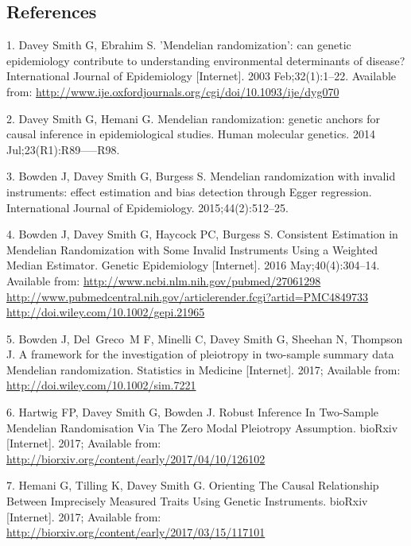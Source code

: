\documentclass[]{article}
\begin{document}
\newpage

\subsection*{References}\label{references}

\hypertarget{refs}{}
\hypertarget{ref-DaveySmith2003}{}
1. Davey Smith G, Ebrahim S. 'Mendelian randomization': can genetic
epidemiology contribute to understanding environmental determinants of
disease? International Journal of Epidemiology {[}Internet{]}. 2003
Feb;32(1):1--22. Available from:
\url{http://www.ije.oxfordjournals.org/cgi/doi/10.1093/ije/dyg070}

\hypertarget{ref-DaveySmithHemani2014}{}
2. Davey Smith G, Hemani G. Mendelian randomization: genetic anchors for
causal inference in epidemiological studies. Human molecular genetics.
2014 Jul;23(R1):R89-----R98.

\hypertarget{ref-Bowden2015}{}
3. Bowden J, Davey Smith G, Burgess S. Mendelian randomization with
invalid instruments: effect estimation and bias detection through Egger
regression. International Journal of Epidemiology. 2015;44(2):512--25.

\hypertarget{ref-Bowden2016b}{}
4. Bowden J, Davey Smith G, Haycock PC, Burgess S. Consistent Estimation
in Mendelian Randomization with Some Invalid Instruments Using a
Weighted Median Estimator. Genetic Epidemiology {[}Internet{]}. 2016
May;40(4):304--14. Available from:
\href{http://www.ncbi.nlm.nih.gov/pubmed/27061298\%20http://www.pubmedcentral.nih.gov/articlerender.fcgi?artid=PMC4849733\%20http://doi.wiley.com/10.1002/gepi.21965}{http://www.ncbi.nlm.nih.gov/pubmed/27061298 http://www.pubmedcentral.nih.gov/articlerender.fcgi?artid=PMC4849733 http://doi.wiley.com/10.1002/gepi.21965}

\hypertarget{ref-Bowden2017}{}
5. Bowden J, Del~Greco~M F, Minelli C, Davey Smith G, Sheehan N,
Thompson J. A framework for the investigation of pleiotropy in
two-sample summary data Mendelian randomization. Statistics in Medicine
{[}Internet{]}. 2017; Available from:
\url{http://doi.wiley.com/10.1002/sim.7221}

\hypertarget{ref-Hartwig2017}{}
6. Hartwig FP, Davey Smith G, Bowden J. Robust Inference In Two-Sample
Mendelian Randomisation Via The Zero Modal Pleiotropy Assumption.
bioRxiv {[}Internet{]}. 2017; Available from:
\url{http://biorxiv.org/content/early/2017/04/10/126102}

\hypertarget{ref-Hemani2017}{}
7. Hemani G, Tilling K, Davey Smith G. Orienting The Causal Relationship
Between Imprecisely Measured Traits Using Genetic Instruments. bioRxiv
{[}Internet{]}. 2017; Available from:
\url{http://biorxiv.org/content/early/2017/03/15/117101}
\end{document}
